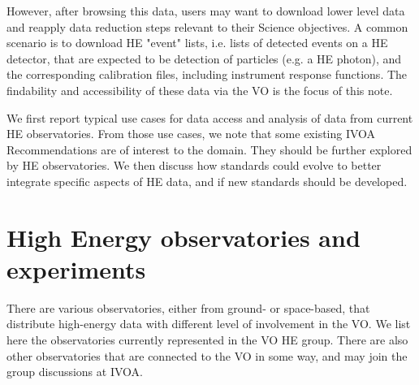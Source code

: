 \documentclass[11pt,a4paper]{ivoa}
\begin{document}
However, after browsing this data, users may want to download lower level data and reapply data reduction steps relevant to their Science objectives. A common scenario is to download HE "event" lists, i.e. lists of detected events on a HE detector, that are expected to be detection of particles (e.g. a HE photon), and the corresponding calibration files, including instrument response functions. The findability and accessibility of these data via the VO is the focus of this note.

We first report typical use cases for data access and analysis of data from current HE observatories. From those use cases, we note that some existing IVOA Recommendations are of interest to the domain. They should be further explored by HE observatories. We then discuss how standards could evolve to better integrate specific aspects of HE data, and if new standards should be developed.








\section{High Energy observatories and experiments}

There are various observatories, either from ground- or space-based, that distribute high-energy data with different level of involvement in the VO. We list here the observatories currently represented in the VO HE group. There are also other observatories that are connected to the VO in some way, and may join the group discussions at IVOA.
\end{document}
